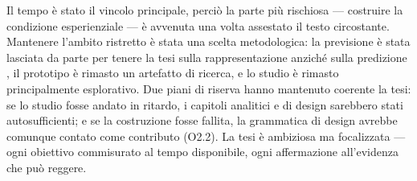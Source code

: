 Il tempo è stato il vincolo principale, perciò la parte più rischiosa --- costruire la condizione esperienziale --- è avvenuta una volta assestato il testo circostante. Mantenere l'ambito ristretto è stata una scelta metodologica: la previsione è stata lasciata da parte per tenere la tesi sulla rappresentazione anziché sulla predizione \citep{sonnewald2021}, il prototipo è rimasto un artefatto di ricerca, e lo studio è rimasto principalmente esplorativo. Due piani di riserva hanno mantenuto coerente la tesi: se lo studio fosse andato in ritardo, i capitoli analitici e di design sarebbero stati autosufficienti; e se la costruzione fosse fallita, la grammatica di design avrebbe comunque contato come contributo (O2.2). La tesi è ambiziosa ma focalizzata --- ogni obiettivo commisurato al tempo disponibile, ogni affermazione all'evidenza che può reggere.

